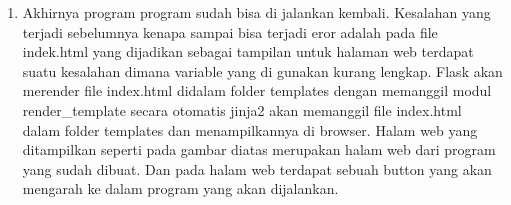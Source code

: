 \begin{enumerate}
\item Akhirnya program program sudah bisa di jalankan kembali.
Kesalahan yang terjadi sebelumnya kenapa sampai bisa terjadi eror adalah pada file indek.html yang dijadikan sebagai tampilan untuk halaman web terdapat suatu kesalahan dimana variable yang di gunakan kurang lengkap. Flask akan merender file index.html didalam folder templates dengan memanggil modul render\_template secara otomatis jinja2 akan memanggil file index.html dalam folder templates dan menampilkannya di browser. Halam web yang ditampilkan seperti pada gambar diatas merupakan halam web dari program yang sudah dibuat.  Dan pada halam web terdapat sebuah button yang akan mengarah ke dalam program yang akan dijalankan.

\end{enumerate}